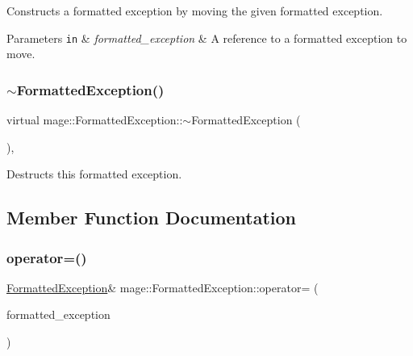 Constructs a formatted exception by moving the given formatted exception.


\begin{DoxyParams}[1]{Parameters}
\mbox{\tt in}  & {\em formatted\+\_\+exception} & A reference to a formatted exception to move. \\
\hline
\end{DoxyParams}
\hypertarget{structmage_1_1_formatted_exception_a074a2e845b0fa0d57dfeab63ee0cb1f5}{}\label{structmage_1_1_formatted_exception_a074a2e845b0fa0d57dfeab63ee0cb1f5} 
\subsubsection{\texorpdfstring{$\sim$\+Formatted\+Exception()}{~FormattedException()}}
{\footnotesize\ttfamily virtual mage\+::\+Formatted\+Exception\+::$\sim$\+Formatted\+Exception (\begin{DoxyParamCaption}{ }\end{DoxyParamCaption})\hspace{0.3cm}{\ttfamily [virtual]}, {\ttfamily [default]}}

Destructs this formatted exception. 

\subsection{Member Function Documentation}
\hypertarget{structmage_1_1_formatted_exception_a36b95a1d6ee656db750f9f7c24a0f69d}{}\label{structmage_1_1_formatted_exception_a36b95a1d6ee656db750f9f7c24a0f69d} 
\subsubsection{\texorpdfstring{operator=()}{operator=()}\hspace{0.1cm}{\footnotesize\ttfamily [1/2]}}
{\footnotesize\ttfamily \hyperlink{structmage_1_1_formatted_exception}{Formatted\+Exception}\& mage\+::\+Formatted\+Exception\+::operator= (\begin{DoxyParamCaption}\item[{const \hyperlink{structmage_1_1_formatted_exception}{Formatted\+Exception} \&}]{formatted\+\_\+exception }\end{DoxyParamCaption})\hspace{0.3cm}{\ttfamily [default]}}

